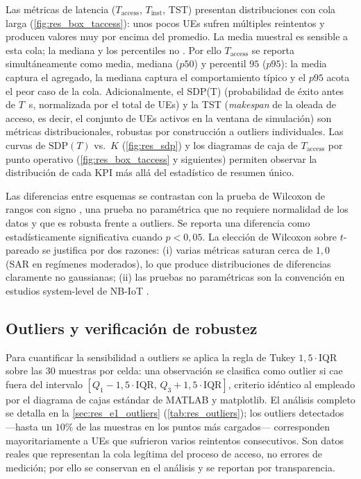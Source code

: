 Las métricas de latencia ($T_{\text{access}}$, $T_{\text{inst}}$, TST) presentan distribuciones con cola larga (\cref{fig:res_box_taccess}): unos pocos UEs sufren múltiples reintentos y producen valores muy por encima del promedio. La media muestral es sensible a esta cola; la mediana y los percentiles no \cite{ref34}. Por ello $T_{\text{access}}$ se reporta simultáneamente como media, mediana ($p50$) y percentil $95$ ($p95$): la media captura el agregado, la mediana captura el comportamiento típico y el $p95$ acota el peor caso de la cola. Adicionalmente, el SDP(T) (probabilidad de éxito antes de $T$~s, normalizada por el total de UEs) y la TST (\emph{makespan} de la oleada de acceso, es decir, el conjunto de UEs activos en la ventana de simulación) son métricas distribucionales, robustas por construcción a outliers individuales. Las curvas de $\mathrm{SDP}(T)$ vs.\ $K$ (\cref{fig:res_sdp}) y los diagramas de caja de $T_{\text{access}}$ por punto operativo (\cref{fig:res_box_taccess} y siguientes) permiten observar la distribución de cada KPI más allá del estadístico de resumen único.

Las diferencias entre esquemas se contrastan con la prueba de Wilcoxon de rangos con signo \cite{ref34}, una prueba no paramétrica que no requiere normalidad de los datos y que es robusta frente a outliers. Se reporta una diferencia como estadísticamente significativa cuando $p<0{,}05$. La elección de Wilcoxon sobre $t$-pareado se justifica por dos razones: (i) varias métricas saturan cerca de $1{,}0$ (SAR en regímenes moderados), lo que produce distribuciones de diferencias claramente no gaussianas; (ii) las pruebas no paramétricas son la convención en estudios system-level de NB-IoT \cite{ref24,ref25}.

\subsection{Outliers y verificación de robustez}
\label{sec:res_config_outliers}

Para cuantificar la sensibilidad a outliers se aplica la regla de Tukey $1{,}5\cdot$IQR sobre las $30$ muestras por celda: una observación se clasifica como outlier si cae fuera del intervalo $[Q_1 - 1{,}5\cdot\text{IQR},\, Q_3 + 1{,}5\cdot\text{IQR}]$, criterio idéntico al empleado por el diagrama de cajas estándar de MATLAB y matplotlib. El análisis completo se detalla en la \cref{sec:res_e1_outliers} (\cref{tab:res_outliers}); los outliers detectados —hasta un $10\%$ de las muestras en los puntos más cargados— corresponden mayoritariamente a UEs que sufrieron varios reintentos consecutivos. Son datos reales que representan la cola legítima del proceso de acceso, no errores de medición; por ello se conservan en el análisis y se reportan por transparencia.

